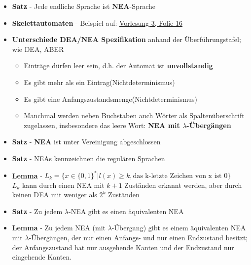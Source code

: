 \documentclass[12pt, a4paper]{article}
\begin{document}
\begin{itemize}
		\item \textbf{Satz} - Jede endliche Sprache ist \textbf{NEA}-Sprache
		
		\item \textbf{Skelettautomaten} - Beispiel auf: \href{https://studip.uni-trier.de/sendfile.php?type=0&file_id=7254db8a14e104a42bcc136f907c13f7&file_name=VL3.pdf}{Vorlesung 3, Folie 16}
		
		\item \textbf{Unterschiede DEA/NEA Spezifikation} anhand der Überführungstafel; wie DEA, ABER
		\begin{itemize}
			\item Einträge dürfen leer sein, d.h. der Automat ist \textbf{unvollstandig}
			\item Es gibt mehr als ein Eintrag(Nichtdeterminismus)
			\item Es gibt eine Anfangszustandsmenge(Nichtdeterminismus)
			\item Manchmal werden neben Buchstaben auch Wörter als Spaltenüberschrift zugelassen, insbesondere das leere Wort: \textbf{NEA mit $\lambda$-Übergängen}
			
		\end{itemize} 
		
		\item \textbf{Satz} - \textbf{NEA} ist unter Vereinigung abgeschlossen
		
		\item \textbf{Satz} - NEAs kennzeichnen die regulären Sprachen
		
		\item \textbf{Lemma} - $L_{k}=\{x\in\{0,1\}^{*}|l(x)\geq k, \text{das k-letzte Zeichen von x ist 0}\}$ \\ 
		$L_{k}$ kann durch einen NEA mit $k+1$ Zuständen erkannt werden, aber durch keinen DEA mit weniger als $2^{k}$ Zuständen
		
		\item \textbf{Satz} - Zu jedem $\lambda$-NEA gibt es einen äquivalenten NEA
		
		\item \textbf{Lemma} - Zu jedem NEA (mit $\lambda$-Übergang) gibt es einem äquivalenten NEA mit $\lambda$-Übergängen, der nur einen Anfangs- und nur einen Endzustand besitzt; der Anfangszustand hat nur ausgehende Kanten und der Endzustand nur eingehende Kanten.
		
	\end{itemize}
\end{document}
